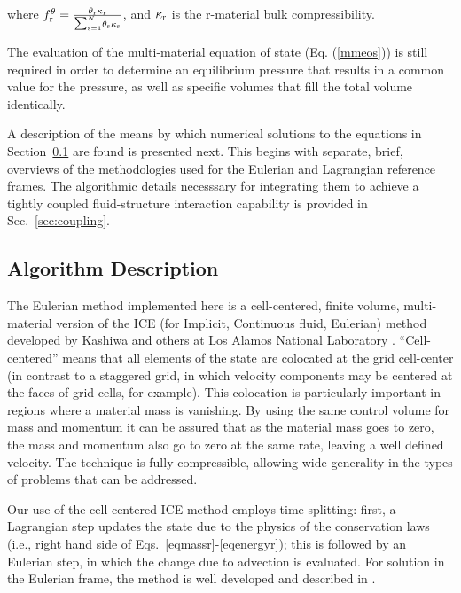 where $f_\rmr^{\theta} = {{\theta_\rmr \kappa_\rmr} \over
{\raise1pt\hbox{${\scriptstyle\sum_{\rms =1}^N}$}} \theta_\rms\kappa_\rms}$,
and $\kappa_{\rm r}$ is the r-material bulk compressibility.

The evaluation of the multi-material equation of state (Eq. (\ref{mmeos}))
is still required in order to determine an equilibrium pressure that results
in a common value for the  pressure, as well as specific volumes that fill
the total volume identically.

A description of the means by which numerical solutions to the equations in
Section~\ref{sec:ICE:algorithm} are found is presented next.  This begins
with separate, brief, overviews of the methodologies used for the Eulerian
and Lagrangian reference frames.  The algorithmic details necesssary for
integrating them to achieve a tightly coupled fluid-structure interaction
capability is provided in Sec.~\ref{sec:coupling}.

\subsection{Algorithm Description}\label{sec:ICE:algorithm}

The Eulerian method implemented here is a cell-centered, finite volume,
multi-material version of the ICE (for Implicit, Continuous fluid, Eulerian)
method \cite{harlowamsden68} developed by Kashiwa and others at Los Alamos
National Laboratory \cite{kashiwaCCICE94}.  ``Cell-centered'' means that all
elements of the state are colocated at the grid cell-center (in contrast to
a staggered grid, in which velocity components may be centered at the faces
of grid cells, for example).  This colocation is particularly important
in regions where a material mass is vanishing.  By using the same control
volume for mass and momentum it can be assured that as the material mass goes
to zero, the mass and momentum also go to zero at the same rate, leaving a
well defined velocity.  The technique is fully compressible, allowing wide
generality in the types of problems that can be addressed.
 
Our use of the cell-centered ICE method employs time splitting: first,
a Lagrangian step updates the state due to the physics of the conservation
laws (i.e., right hand side of Eqs.~{\ref{eqmassr}-\ref{eqenergyr}}); this
is followed by an Eulerian step, in which the change due to advection is
evaluated.  For solution in the Eulerian frame, the method is well developed
and described in \cite{kashiwaCCICE94}.


